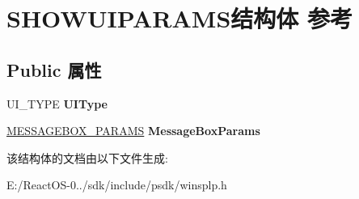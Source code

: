 \hypertarget{struct_s_h_o_w_u_i_p_a_r_a_m_s}{}\section{S\+H\+O\+W\+U\+I\+P\+A\+R\+A\+M\+S结构体 参考}
\label{struct_s_h_o_w_u_i_p_a_r_a_m_s}
\subsection*{Public 属性}
\begin{DoxyCompactItemize}
\item 
\mbox{\label{struct_s_h_o_w_u_i_p_a_r_a_m_s_af9217b907654e4bb6db2ab71db48354c}} 
U\+I\+\_\+\+T\+Y\+PE {\bfseries U\+I\+Type}
\item 
\mbox{\label{struct_s_h_o_w_u_i_p_a_r_a_m_s_a1226a953c3dcaea8306c9fdda9ed1d3c}} 
\hyperlink{struct_m_e_s_s_a_g_e_b_o_x___p_a_r_a_m_s}{M\+E\+S\+S\+A\+G\+E\+B\+O\+X\+\_\+\+P\+A\+R\+A\+MS} {\bfseries Message\+Box\+Params}
\end{DoxyCompactItemize}


该结构体的文档由以下文件生成\+:\begin{DoxyCompactItemize}
\item 
E\+:/\+React\+O\+S-\/0../sdk/include/psdk/winsplp.\+h\end{DoxyCompactItemize}
